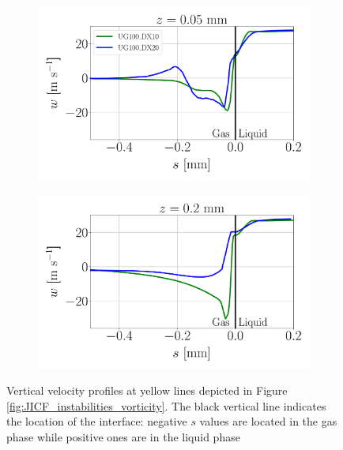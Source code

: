 \begin{figure}[ht]
\flushleft
\begin{subfigure}[b]{0.45\textwidth}
	\flushleft
   \includegraphics[scale=0.25]{./part2_developments/figures_ch5_resolved_JICF/instabilities_resolution/line_data_outside_injector_z_low}
\end{subfigure}
\hfill
\begin{subfigure}[b]{0.45\textwidth}
	\flushleft
   \includegraphics[scale=0.25]{./part2_developments/figures_ch5_resolved_JICF/instabilities_resolution/line_data_outside_injector_z_upper}
\end{subfigure}
	\vspace*{-0.1in}
   \caption[Vertical velocity profiles at yellow lines depicted in Figure \ref{fig:JICF_instabilities_vorticity}]{Vertical velocity profiles at yellow lines depicted in Figure \ref{fig:JICF_instabilities_vorticity}. The black vertical line indicates the location of the interface: negative $s$ values are located in the gas phase while positive ones are in the liquid phase}
\label{fig:jicf_data_lines_outside_injector}
\end{figure}

